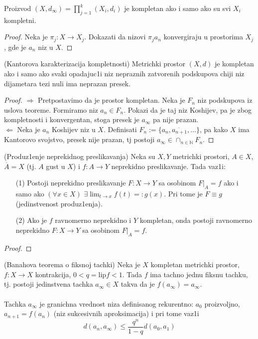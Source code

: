 \documentclass[a4paper,12pt]{article}
\newcommand{\NN}{\mathbb{N}}
\begin{document}
\begin{tvr}
Proizvod $(X, d_{\infty}) = \prod_{j=1}^{k} (X_i, d_i)$ je kompletan ako i samo ako su svi $X_i$ kompletni.
\end{tvr}
\begin{proof}
Neka je $\pi_j : X \to X_j$. Dokazati da nizovi $\pi_j a_n$ konvergiraju u prostorima $X_j$, gde je $a_n$ niz u $X$.
\end{proof}

\begin{tma}
(Kantorova karakterizacija kompletnosti) Metrichki prostor $(X,d)$ je kompletan ako i samo ako svaki opadajuc1i niz nepraznih zatvorenih podskupova chiji niz dijametara tezi nuli ima neprazan presek.
\end{tma}
\begin{proof}
$\boxed{\Rightarrow}$ Pretpostavimo da je prostor kompletan. Neka je $F_n$ niz podskupova iz uslova teoreme. Formiramo niz $a_n \in F_n$. Pokazi da je taj niz Koshijev, pa je zbog kompletnosti i konvergentan, stoga presek je $a_{\infty}$ pa nije prazan. \\
$\boxed{\Leftarrow}$ Neka je $a_n$ Koshijev niz u $X$. Definisati $F_n := \{\overline{a_n ,a_{n+1}, ...}\}$, pa kako $X$ ima Kantorovo svojstvo, presek nije prazan, tj postoji $a_{\infty} \in \cap_{n \in \NN} F_n$.
\end{proof}

\begin{tma}
(Produz1enje neprekidnog preslikavanja) Neka su $X, Y$ metrichki prostori, $A \in X$, $\overline{A} = X$ (tj. $A$ gust u $X$) i $f: A \to Y$ neprekidno preslikavanje. Tada vaz1i:
\begin{itemize}
\item[(1)] Postoji neprekidno preslikavanje $F: X \to Y$ sa osobinom $F|_{A} = f$ ako i samo ako $(\forall x \in X)$ $\exists \lim_{t \to x} f(t) =: g(x)$. Pri tome je $F \equiv g$ (jedinstvenost produz1enja).
\item[(2)] Ako je $f$ ravnomerno neprekidno i $Y$ kompletan, onda postoji ravnomerno neprekidno $F: X \to Y$ sa osobinom $F|_{A} = f$.
\end{itemize}
\end{tma}
\begin{proof}

\end{proof}

\begin{tma}
(Banahova teorema o fiksnoj tachki) Neka je $X$ kompletan metrichki prostor, $f: X \to X$ kontrakcija, $0 < q = \mathrm{lip} f < 1$. Tada $f$ ima tachno jednu fiksnu tachku, tj. postoji jedinstvena tachka $a_{\infty} \in X$ takva da je $f(a_{\infty}) = a_{\infty}$.\\ \\
Tachka $a_{\infty}$ je granichna vrednost niza definisanog rekurentno: $a_0$ proizvoljno, $a_{n+1} = f(a_n)$ (niz sukcesivnih aproksimacija) i pri tome vaz1i \[d(a_n, a_{\infty}) \leq \frac{q^n}{1-q} d(a_0, a_1)\]
\end{tma}
\end{document}

